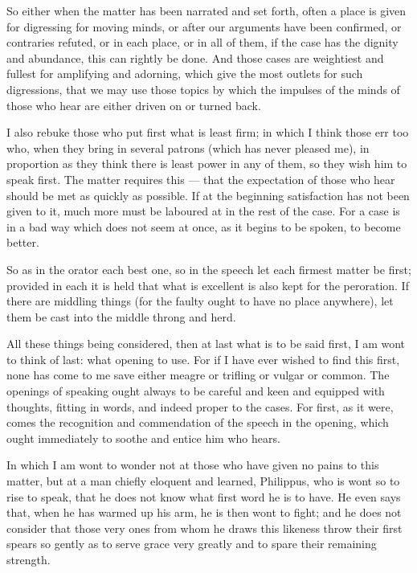  So either when the matter has been narrated and set forth, often a place is given for digressing for moving minds, or after our arguments have been confirmed, or contraries refuted, or in each place, or in all of them, if the case has the dignity and abundance, this can rightly be done. And those cases are weightiest and fullest for amplifying and adorning, which give the most outlets for such digressions, that we may use those topics by which the impulses of the minds of those who hear are either driven on or turned back.

 I also rebuke those who put first what is least firm; in which I think those err too who, when they bring in several patrons (which has never pleased me), in proportion as they think there is least power in any of them, so they wish him to speak first. The matter requires this — that the expectation of those who hear should be met as quickly as possible. If at the beginning satisfaction has not been given to it, much more must be laboured at in the rest of the case. For a case is in a bad way which does not seem at once, as it begins to be spoken, to become better.

 So as in the orator each best one, so in the speech let each firmest matter be first; provided in each it is held that what is excellent is also kept for the peroration. If there are middling things (for the faulty ought to have no place anywhere), let them be cast into the middle throng and herd.

 All these things being considered, then at last what is to be said first, I am wont to think of last: what opening to use. For if I have ever wished to find this first, none has come to me save either meagre or trifling or vulgar or common. The openings of speaking ought always to be careful and keen and equipped with thoughts, fitting in words, and indeed proper to the cases. For first, as it were, comes the recognition and commendation of the speech in the opening, which ought immediately to soothe and entice him who hears.

 In which I am wont to wonder not at those who have given no pains to this matter, but at a man chiefly eloquent and learned, Philippus, who is wont so to rise to speak, that he does not know what first word he is to have. He even says that, when he has warmed up his arm, he is then wont to fight; and he does not consider that those very ones from whom he draws this likeness throw their first spears so gently as to serve grace very greatly and to spare their remaining strength.

